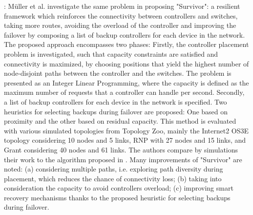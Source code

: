 \documentclass[a4paper,10pt]{article}
\begin{document}
\cite{MuOl14}: Müller et al. investigate the same problem in \cite{ZhBe11} proposing "Survivor": a resilient framework which reinforces the connectivity between controllers and switches, taking more routes, avoiding the overload of the controller and improving the failover by composing a list of backup controllers for each device in the network. The proposed approach encompasses two phases: Firstly, the controller placement problem is investigated, such that capacity constraints are satisfied and connectivity is maximized, by choosing positions that yield the highest number of node-disjoint paths between the controller and the switches. The problem is presented as an Integer Linear Programming, where the capacity is defined as the maximum number of requests that a controller can handle per second. Secondly, a list of backup controllers for each device in the network is specified. Two heuristics for selecting backups during failover are proposed: One based on proximity and the other based on residual capacity. This method is evaluated with various simulated topologies from Topology Zoo, mainly the Internet2 OS3E topology considering 10 nodes and 5 links, RNP with 27 nodes and 15 links, and Grant considering 40 nodes and 61 links.   The authors compare by simulations their work to the algorithm proposed in \cite{ZhBe11}. Many improvements of "Survivor" are noted: (a) considering multiple paths, i.e. exploring path diversity during placement, which reduces the chance of connectivity loss; (b) taking into consideration the capacity to avoid controllers overload; (c) improving smart recovery mechanisms thanks to the proposed heuristic for selecting backups during failover.

\end{document}
